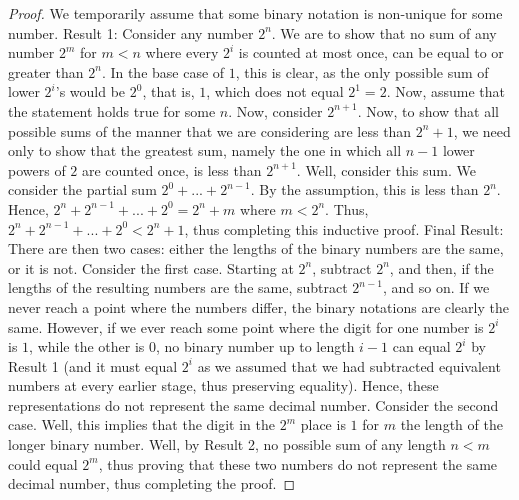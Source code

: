 \documentclass{article}
\theoremstyle{definition}
\begin{document}
\begin{proof}
We temporarily assume that some binary notation is non-unique for some number.\newline
\newline Result 1: Consider any number $2^n$. We are to show that no sum of any number $2^m$ for $m<n$ where every $2^i$ is counted at most once, 
can be equal to or greater than $2^n$. In the base case of $1$, this is clear, as the only possible sum of lower $2^i$'s would be $2^0$, that is, $1$, 
which does not equal $2^1=2$. Now, assume that the statement holds true for some $n$. Now, consider $2^{n+1}$. Now, to show that all possible sums of the 
manner that we are considering are less than $2^n+1$, we need only to show that the greatest sum, namely the one in which all $n-1$ lower powers of $2$ are 
counted once, is less than $2^{n+1}$. Well, consider this sum. We consider the partial sum $2^0+...+2^{n-1}$. By the assumption, this is less 
than $2^n$. Hence, $2^n+2^{n-1}+...+2^0=2^n+m$ where $m<2^n$. Thus, $2^n+2^{n-1}+...+2^0<2^n+1$, thus completing this inductive proof.\newline
\newline Final Result: There are then two cases: either the lengths of the binary numbers are the same, or it is not.
\newline \newline Consider the first case. Starting at $2^n$, subtract
$2^n$, and then, if the lengths of the resulting numbers are the same, subtract $2^{n-1}$, and so on. If we never reach a point where the numbers differ, the
binary notations are clearly the same. However, if we ever reach some point where the digit for one number is $2^i$ is $1$, while the other is $0$, no binary
number up to length $i-1$ can equal $2^i$ by Result 1 (and it must equal $2^i$ as we assumed that we had subtracted equivalent numbers at every earlier
stage, thus preserving equality). Hence, these representations do not represent the same decimal number.\newline \newline 
Consider the second case. Well, this implies that the digit in the $2^m$ place is $1$ for $m$ the length of the longer binary number. Well, by Result 2, 
no possible sum of any length $n<m$ could equal $2^m$, thus proving that these two numbers do not represent the same decimal number, thus completing 
the proof. 
\end{proof}
\end{document}
